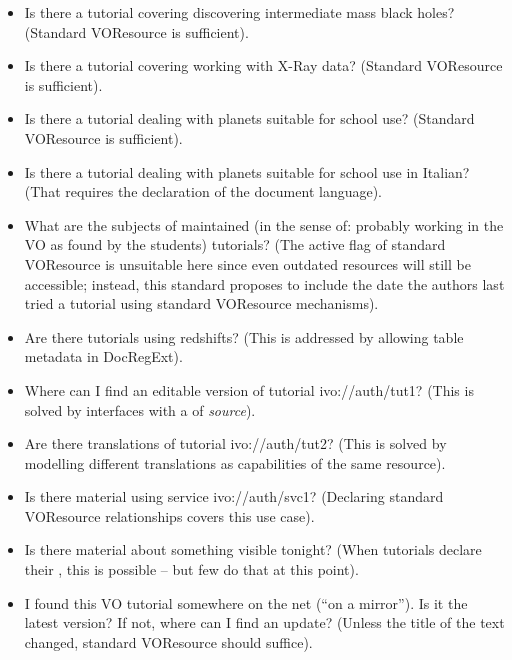 \documentclass{ivoa}
\begin{document}
\begin{itemize}

\item Is there a tutorial covering discovering intermediate mass black
holes? (Standard VOResource is sufficient).

\item Is there a tutorial covering working with X-Ray data? (Standard
VOResource is sufficient).

\item Is there a tutorial dealing with planets suitable for school use?
(Standard VOResource is sufficient).

\item Is there a tutorial dealing with planets suitable for school use in
Italian? (That requires the declaration of the document language).

\item What are the subjects of maintained (in the sense of: probably
working in the VO as found by the students) tutorials?
(The active flag of standard VOResource is
unsuitable here since even outdated resources will still be accessible;
instead, this standard proposes to include the date the authors last
tried a tutorial using standard VOResource mechanisms).

\item Are there tutorials using redshifts? (This is addressed by allowing
table metadata in DocRegExt).

\item Where can I find an editable version of tutorial ivo://auth/tut1?
(This is solved by interfaces with a  of \textit{source}).

\item Are there translations of tutorial ivo://auth/tut2? (This is
solved by modelling different translations as capabilities of the same
resource).

\item Is there material using service ivo://auth/svc1? (Declaring
standard VO\-Re\-source relationships covers this use case).

\item Is there material about something visible tonight? (When tutorials
declare their , this is possible -- but few do that at this
point).

\item I found this VO tutorial somewhere on the net (``on a mirror'').  Is it
the latest version?  If not, where can I find an update? (Unless the
title of the text changed, standard VOResource should suffice).

\end{itemize}
\end{document}
